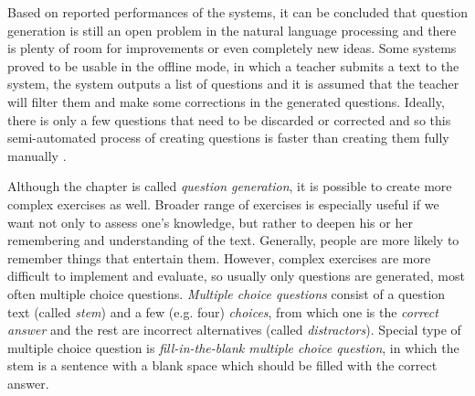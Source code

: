 \documentclass[12pt, twoside]{fithesis2}
\renewcommand{\_}{\leavevmode \kern0.07em\vbox{\hrule width0.4em}}
\newcounter{choice}
\begin{document}
Based on reported performances of the systems, it can be concluded that question generation is still an open problem in the natural language processing and there is plenty of room for improvements or even completely new ideas.
Some systems proved to be usable in the offline mode, in which a teacher submits a text to the system,
the system outputs a list of questions and it is assumed that the teacher will filter them and make some corrections in the generated questions. Ideally, there is only a few questions that need to be discarded or corrected and so this semi-automated process of creating questions is faster than creating them fully manually
\cite{question-gen-mitkov}.

Although the chapter is called \textit{question generation},
it is possible to create more complex exercises as well.
Broader range of exercises is especially useful if we want not only to assess one's knowledge, but rather to deepen his or her remembering and understanding of the text.
Generally, people are more likely to remember things that entertain them.
However, complex exercises are more difficult to implement and evaluate,
so usually only questions are generated, most often multiple choice questions.
\textit{Multiple choice questions} consist of a question text (called \textit{stem})
and a few (e.g. four) \textit{choices}, from which one is the \textit{correct answer}
and the rest are incorrect alternatives (called \textit{distractors}).
Special type of multiple choice question is \textit{fill-in-the-blank multiple choice question},
in which the stem is a sentence with a blank space which should be filled with the correct answer.
\end{document}
